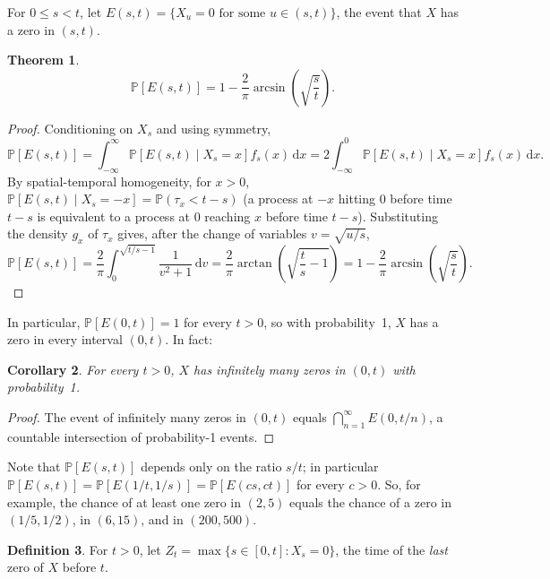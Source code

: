 \documentclass[12pt,openany]{book}
\newtheorem{theorem}{Theorem}[section]
\newtheorem{corollary}[theorem]{Corollary}
\theoremstyle{definition}
\newtheorem{definition}[theorem]{Definition}
\theoremstyle{remark}
\newcommand{\Prob}{\mathbb{P}}
\newcommand{\dd}{\,\mathrm{d}}
\begin{document}
For $0\le s < t$, let $E(s,t) = \{X_u = 0 \text{ for some } u \in (s,t)\}$, the event that $X$ has a zero in $(s,t)$.
 
\begin{theorem}
\begin{equation}
    \Prob[E(s,t)] = 1 - \frac{2}{\pi}\arcsin\!\left(\sqrt{\frac st}\right). \tag{18.1.29}
\end{equation}
\end{theorem}
\begin{proof}
Conditioning on $X_s$ and using symmetry,
\begin{equation}
    \Prob[E(s,t)] = \int_{-\infty}^\infty \Prob[E(s,t)\mid X_s=x] f_s(x)\dd x = 2\int_{-\infty}^0 \Prob[E(s,t)\mid X_s = x]f_s(x)\dd x. \tag{18.1.30}
\end{equation}
By spatial-temporal homogeneity, for $x>0$, $\Prob[E(s,t)\mid X_s=-x] = \Prob(\tau_x < t-s)$ (a process at $-x$ hitting $0$ before time $t-s$ is equivalent to a process at $0$ reaching $x$ before time $t-s$). Substituting the density $g_x$ of $\tau_x$ gives, after the change of variables $v = \sqrt{u/s}$,
\begin{equation}
    \Prob[E(s,t)] = \frac{2}{\pi}\int_0^{\sqrt{t/s-1}} \frac{1}{v^2+1}\dd v = \frac{2}{\pi}\arctan\!\left(\sqrt{\frac ts - 1}\right) = 1 - \frac{2}{\pi}\arcsin\!\left(\sqrt{\frac st}\right). \tag{18.1.33}
\end{equation}
\end{proof}
 
In particular, $\Prob[E(0,t)] = 1$ for every $t>0$, so with probability~1, $X$ has a zero in every interval $(0,t)$. In fact:
 
\begin{corollary}
For every $t>0$, $X$ has infinitely many zeros in $(0,t)$ with probability~1.
\end{corollary}
\begin{proof}
The event of infinitely many zeros in $(0,t)$ equals $\bigcap_{n=1}^\infty E(0,t/n)$, a countable intersection of probability-1 events.
\end{proof}
 
Note that $\Prob[E(s,t)]$ depends only on the ratio $s/t$; in particular $\Prob[E(s,t)] = \Prob[E(1/t,1/s)] = \Prob[E(cs,ct)]$ for every $c>0$. So, for example, the chance of at least one zero in $(2,5)$ equals the chance of a zero in $(1/5,1/2)$, in $(6,15)$, and in $(200,500)$.
 
\begin{definition}
For $t>0$, let $Z_t = \max\{s \in [0,t] : X_s = 0\}$, the time of the \emph{last} zero of $X$ before $t$.
\end{definition}
 
\end{document}
